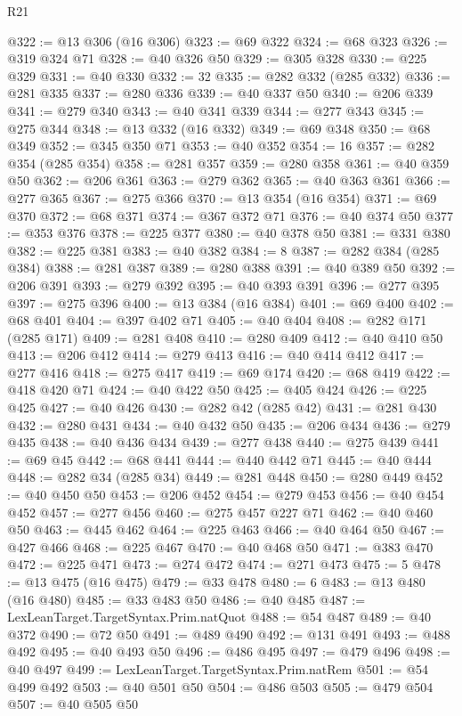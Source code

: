 \begin{lexlean}{R21}
\begin{coremodule}
@322 := @13 @306 (@16 @306)
@323 := @69 @322
@324 := @68 @323
@326 := @319 @324 @71
@328 := @40 @326 @50
@329 := @305 @328
@330 := @225 @329
@331 := @40 @330
@332 := 32
@335 := @282 @332 (@285 @332)
@336 := @281 @335
@337 := @280 @336
@339 := @40 @337 @50
@340 := @206 @339
@341 := @279 @340
@343 := @40 @341 @339
@344 := @277 @343
@345 := @275 @344
@348 := @13 @332 (@16 @332)
@349 := @69 @348
@350 := @68 @349
@352 := @345 @350 @71
@353 := @40 @352
@354 := 16
@357 := @282 @354 (@285 @354)
@358 := @281 @357
@359 := @280 @358
@361 := @40 @359 @50
@362 := @206 @361
@363 := @279 @362
@365 := @40 @363 @361
@366 := @277 @365
@367 := @275 @366
@370 := @13 @354 (@16 @354)
@371 := @69 @370
@372 := @68 @371
@374 := @367 @372 @71
@376 := @40 @374 @50
@377 := @353 @376
@378 := @225 @377
@380 := @40 @378 @50
@381 := @331 @380
@382 := @225 @381
@383 := @40 @382
@384 := 8
@387 := @282 @384 (@285 @384)
@388 := @281 @387
@389 := @280 @388
@391 := @40 @389 @50
@392 := @206 @391
@393 := @279 @392
@395 := @40 @393 @391
@396 := @277 @395
@397 := @275 @396
@400 := @13 @384 (@16 @384)
@401 := @69 @400
@402 := @68 @401
@404 := @397 @402 @71
@405 := @40 @404
@408 := @282 @171 (@285 @171)
@409 := @281 @408
@410 := @280 @409
@412 := @40 @410 @50
@413 := @206 @412
@414 := @279 @413
@416 := @40 @414 @412
@417 := @277 @416
@418 := @275 @417
@419 := @69 @174
@420 := @68 @419
@422 := @418 @420 @71
@424 := @40 @422 @50
@425 := @405 @424
@426 := @225 @425
@427 := @40 @426
@430 := @282 @42 (@285 @42)
@431 := @281 @430
@432 := @280 @431
@434 := @40 @432 @50
@435 := @206 @434
@436 := @279 @435
@438 := @40 @436 @434
@439 := @277 @438
@440 := @275 @439
@441 := @69 @45
@442 := @68 @441
@444 := @440 @442 @71
@445 := @40 @444
@448 := @282 @34 (@285 @34)
@449 := @281 @448
@450 := @280 @449
@452 := @40 @450 @50
@453 := @206 @452
@454 := @279 @453
@456 := @40 @454 @452
@457 := @277 @456
@460 := @275 @457 @227 @71
@462 := @40 @460 @50
@463 := @445 @462
@464 := @225 @463
@466 := @40 @464 @50
@467 := @427 @466
@468 := @225 @467
@470 := @40 @468 @50
@471 := @383 @470
@472 := @225 @471
@473 := @274 @472
@474 := @271 @473
@475 := 5
@478 := @13 @475 (@16 @475)
@479 := @33 @478
@480 := 6
@483 := @13 @480 (@16 @480)
@485 := @33 @483 @50
@486 := @40 @485
@487 := LexLeanTarget.TargetSyntax.Prim.natQuot
@488 := @54 @487
@489 := @40 @372
@490 := @72 @50
@491 := @489 @490
@492 := @131 @491
@493 := @488 @492
@495 := @40 @493 @50
@496 := @486 @495
@497 := @479 @496
@498 := @40 @497
@499 := LexLeanTarget.TargetSyntax.Prim.natRem
@501 := @54 @499 @492
@503 := @40 @501 @50
@504 := @486 @503
@505 := @479 @504
@507 := @40 @505 @50

\end{coremodule}
\end{lexlean}
